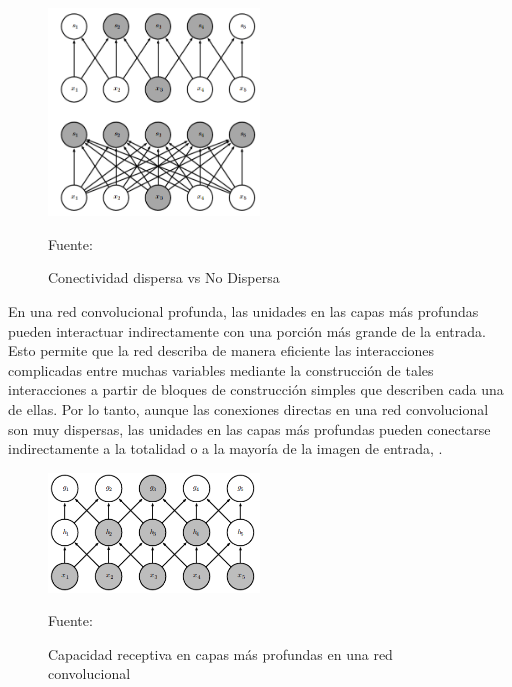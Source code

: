 		\begin{figure}[H]
		\begin{center}
		\includegraphics[width=0.5\textwidth]{images/marcoteorico/sparceCon}
		\end{center}
		\begin{center}
		\caption{\footnotesize \small{Conectividad dispersa vs No Dispersa}}
		\vskip -0.2cm  
		{\small{Fuente: \cite{Goodfellow-et-al-2016}}}
		\end{center}
		\vspace{-1.9em}
		\end{figure} 	

		  
		En una red convolucional profunda, las unidades en las capas más profundas pueden interactuar indirectamente con una porción más grande de la entrada. Esto permite que la red describa de manera eficiente las interacciones complicadas entre muchas variables mediante la construcción de tales interacciones a partir de bloques de construcción simples que describen cada una de ellas. Por lo tanto, aunque las conexiones directas en una red convolucional son muy dispersas, las unidades en las capas más profundas pueden conectarse indirectamente a la totalidad o a la mayoría de la imagen de entrada, \citep{Goodfellow-et-al-2016}.
		\begin{figure}[H]
		\begin{center}
		\includegraphics[width=0.5\textwidth]{images/marcoteorico/sparceCondeep}
		\end{center}
		\begin{center}
		\caption{\footnotesize \small{Capacidad receptiva en capas más profundas en una red convolucional}}
		\vskip -0.2cm  
		{\small{Fuente: \cite{Goodfellow-et-al-2016}}}
		\end{center}
		\vspace{-1.9em}
		\end{figure} 	


